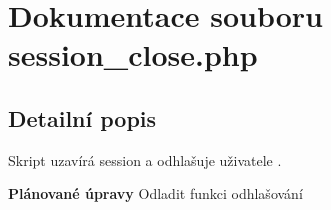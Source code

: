 \section{Dokumentace souboru session\_\-close.php}
\label{session__close_8php}


\subsection{Detailní popis}
Skript uzavírá session a odhlašuje uživatele .

\begin{Desc}
\item[{\bf Plánované úpravy}]Odladit funkci odhlašování \end{Desc}
